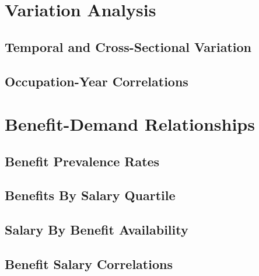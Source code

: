\documentclass{article}
\begin{document}
\section{Variation Analysis}
\subsection{Temporal and Cross-Sectional Variation}


\subsection{Occupation-Year Correlations}

\section{Benefit-Demand Relationships}
\subsection{Benefit Prevalence Rates}


\subsection{Benefits By Salary Quartile}


\subsection{Salary By Benefit Availability}


\subsection{Benefit Salary Correlations}

\end{document}

